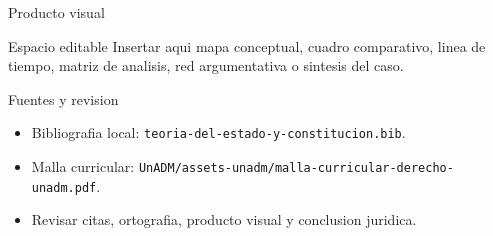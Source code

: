 \documentclass[
  spanish,
  aspectratio=169,
  xcolor={dvipsnames,table}
]{beamer}
\begin{document}
\begin{frame}{Producto visual}
  \begin{block}{Espacio editable}
    Insertar aqui mapa conceptual, cuadro comparativo, linea de tiempo,
    matriz de analisis, red argumentativa o sintesis del caso.
  \end{block}
  \centering
\end{frame}

\begin{frame}{Fuentes y revision}
  \begin{itemize}
    \item Bibliografia local: \texttt{teoria-del-estado-y-constitucion.bib}.
    \item Malla curricular: \texttt{UnADM/assets-unadm/malla-curricular-derecho-unadm.pdf}.
    \item Revisar citas, ortografia, producto visual y conclusion juridica.
  \end{itemize}
\end{frame}
\end{document}
